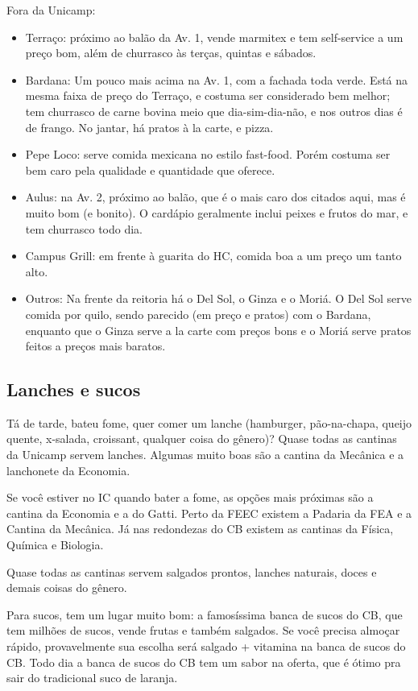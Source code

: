 Fora da Unicamp:

\begin{itemize}
\item Terraço: próximo ao balão da Av. 1, vende marmitex e tem self-service a um
  preço bom, além de churrasco às terças, quintas e sábados.
\item Bardana: Um pouco mais acima na Av. 1, com a fachada toda verde. Está na
  mesma faixa de preço do Terraço, e costuma ser considerado bem melhor; tem
  churrasco de carne bovina meio que dia-sim-dia-não, e nos outros dias é de
  frango. No jantar, há pratos à la carte, e pizza.
\item Pepe Loco: serve comida mexicana no estilo fast-food. Porém costuma ser
  bem caro pela qualidade e quantidade que oferece.
\item Aulus: na Av. 2, próximo ao balão, que é o mais caro dos citados aqui, mas
  é muito bom (e bonito). O cardápio geralmente inclui peixes e frutos do mar, e
  tem churrasco todo dia.
\item Campus Grill: em frente à guarita do HC, comida boa a um preço um tanto
  alto.
\item Outros: Na frente da reitoria há o Del Sol, o Ginza e o Moriá.  O Del Sol
  serve comida por quilo, sendo parecido (em preço e pratos) com o Bardana,
  enquanto que o Ginza serve a la carte com preços bons e o Moriá serve pratos
  feitos a preços mais baratos. 
\end{itemize}

\subsection{Lanches e sucos}

Tá de tarde, bateu fome, quer comer um lanche (hamburger, pão-na-chapa, queijo
quente, x-salada, croissant, qualquer coisa do gênero)? Quase todas as cantinas
da Unicamp servem lanches. Algumas muito boas são a cantina da Mecânica e a
lanchonete da Economia.

Se você estiver no IC quando bater a fome, as opções mais próximas são a cantina
da Economia e a do Gatti. Perto da FEEC existem a Padaria da FEA e a Cantina da
Mecânica. Já nas redondezas do CB existem as cantinas da Física, Química e Biologia.

Quase todas as cantinas servem salgados prontos, lanches naturais, doces e
demais coisas do gênero.

Para sucos, tem um lugar muito bom: a famosíssima banca de sucos do CB, que tem
milhões de sucos, vende frutas e também salgados.  Se você precisa almoçar
rápido, provavelmente sua escolha será salgado + vitamina na banca de sucos do
CB. Todo dia a banca de sucos do CB tem um sabor na oferta, que é ótimo pra sair
do tradicional suco de laranja.

